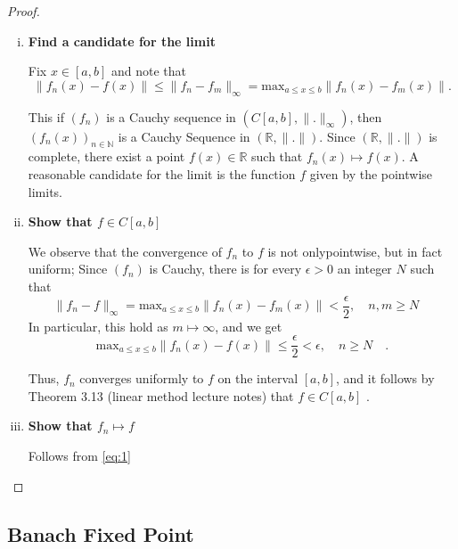 \documentclass{article}
\theoremstyle{remark}
\begin{document}
\begin{proof}
  \begin{enumerate}[(i)]
    \item \textbf{Find a candidate for the limit}  
    \par  
    Fix $x \in [a,b]$ and note that \[
      \|f_{n}\left( x \right)  - f\left( x \right) \| \le \|f_n - f_m\|_{\infty} = \text{max}_{a \le x \le b } \|f_n\left( x \right) - f_m\left( x \right) \|.
    \] 

    This if $\left( f_n \right) $ is a Cauchy sequence in $\left( C[a,b], \|.\|_{\infty} \right) $, then $\left( f_n\left( x \right)  \right)_{n \in \mathbb{N}} $ is a Cauchy Sequence in $\left( \mathbb{R}, \|.\| \right) $. Since $\left( \mathbb{R}, \|.\| \right) $ is complete, there exist a point $f\left( x \right) \in \mathbb{R}$ such that $f_{n}\left( x \right) \mapsto f\left( x \right) $. A reasonable candidate for the limit is the function $f$ given by the pointwise limits. 

  \item \textbf{Show that $f \in C[a,b]$} 
      \par
      We observe that the convergence of $f_n$ to $f$ is not onlypointwise, but in fact uniform; Since $\left( f_n \right) $ is Cauchy, there is for every $\epsilon > 0 $ an integer $N$ such that \[
        \|f_n - f\|_{\infty} =  \text{max}_{a \le x \le b} \|f_n\left( x \right) -  f_m\left( x \right) \| < \frac{\epsilon}{2}, \quad n,m \ge N \quad  
      \] 
      In particular, this hold as $m \mapsto \infty$, and we get 
      \begin{equation}
      \label{eq:1}
      \text{max}_{a \le x \le b} \|f_n\left( x \right)  - f\left( x \right) \| \le \frac{\epsilon}{2} < \epsilon, \quad n\ge N \quad  
      .\end{equation}

      Thus, $f_n$ converges uniformly to $f$ on the interval $[a,b]$, and it follows by Theorem 3.13 (linear method lecture notes) that $f \in C[a,b]$ .

    \item \textbf{Show that $f_n \mapsto f$} 
        \par
        Follows from \eqref{eq:1} 

  \end{enumerate}
\end{proof}

\subsection{Banach Fixed Point}%
\label{sub:banach_fixed_point}
\end{document}

